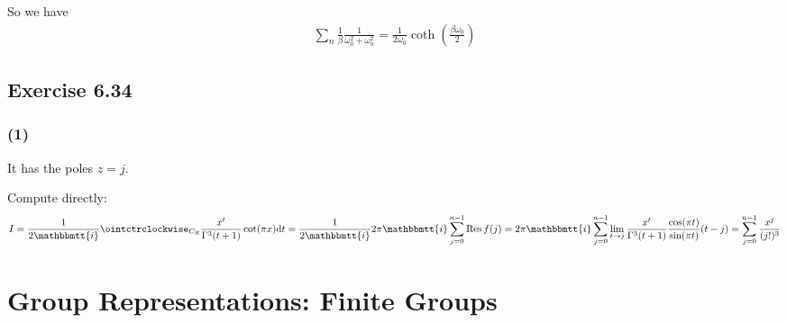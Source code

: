 \documentclass[]{ctexart}
\newcommand{\mi}{\mathbbmtt{i}}
\newcommand{\di}{\mathrm{d}}
\begin{document}
			So we have
				\begin{equation*}
				\begin{aligned}
					\sum_{n}\frac{1}{\beta}\frac{1}{\omega_0^2+\omega_{n}^2}=\frac{1}{2\omega_0}\coth\left(\frac{\beta\omega_0}{2}\right)
				\end{aligned}
				\end{equation*}
				
	\subsection{Exercise 6.34}
		\subsubsection*{(1)}
			It has the poles $z=j$.
			
			Compute directly:
			\begin{equation*}
			\begin{aligned}
			I=\frac{1}{2\mi}\ointctrclockwise_{C_R}\frac{x^t}{\Gamma^3(t+1)}\cot(\pi x)\di t=\frac{1}{2\mi}2\pi \mi \sum_{j=0}^{n-1}\operatorname{Res}f(j)=2\pi\mi \sum_{j=0}^{n-1}\lim_{t\to j}\frac{x^t}{\Gamma^3(t+1)}\frac{\cos(\pi t)}{\sin (\pi t)}(t-j)=\sum_{j=0}^{n-1}\frac{x^j}{(j!)^3}
			\end{aligned}
			\end{equation*}


\section{Group Representations: Finite Groups}
\end{document}
